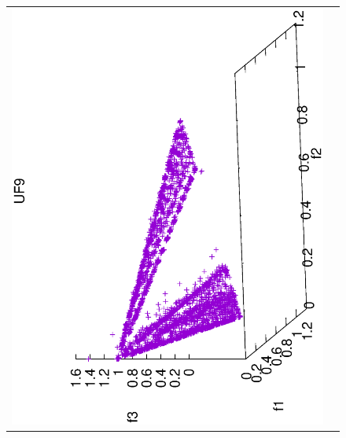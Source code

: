 \begin{figure}[H]
\begin{tabular}{cc}
 \includegraphics[scale=0.3, angle=-90,origin=c]{Figures_Chapter7/Results_Chapter4/Summary_Representative/VSD-MOEA/UF9.eps} &

\end{tabular}
\end{figure}
